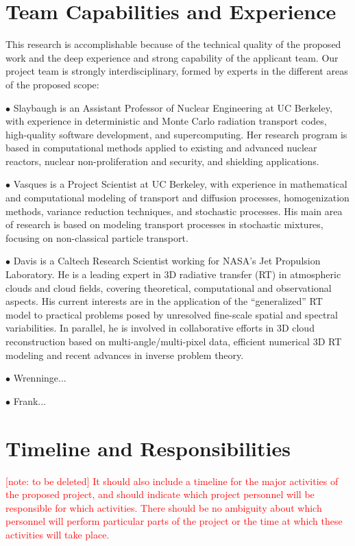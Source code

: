 \documentclass[12pt]{article}
\begin{document}
\section{Team Capabilities and Experience}

This research is accomplishable because of the technical quality of the proposed work and the deep experience and strong capability of the applicant team.
Our project team is strongly interdisciplinary, formed by experts in the different areas of the proposed scope:

$\bullet$ Slaybaugh is an Assistant Professor of Nuclear Engineering at UC Berkeley, with experience in deterministic and Monte Carlo radiation transport codes, high-quality software development, and supercomputing.
Her research program is based in computational methods applied to existing and advanced nuclear reactors, nuclear non-proliferation and security, and shielding applications.

$\bullet$ Vasques is a Project Scientist at UC Berkeley, with experience in mathematical and computational modeling of transport and diffusion processes, homogenization methods, variance reduction techniques, and stochastic processes.
His main area of research is based on modeling transport processes in stochastic mixtures, focusing on non-classical particle transport.

$\bullet$ Davis is a Caltech Research Scientist working for NASA's Jet Propulsion Laboratory.
He is a leading expert in 3D radiative transfer (RT) in atmospheric clouds and cloud fields, covering theoretical, computational and observational aspects.
His current interests are in the application of the ``generalized'' RT model to practical problems posed by unresolved fine-scale spatial and spectral variabilities.
In parallel, he is involved in collaborative efforts in 3D cloud reconstruction based on multi-angle/multi-pixel data, efficient numerical 3D RT modeling and recent advances in inverse problem theory.

$\bullet$ Wrenninge...

$\bullet$ Frank...


\section{Timeline and Responsibilities}

\textcolor{red}{[note: to be deleted] It should also include a timeline for the major activities of the proposed
project, and should indicate which project personnel will be responsible for which activities.
There should be no ambiguity about which personnel will perform particular parts of the project or the time at which these activities will take place.}
\end{document}
